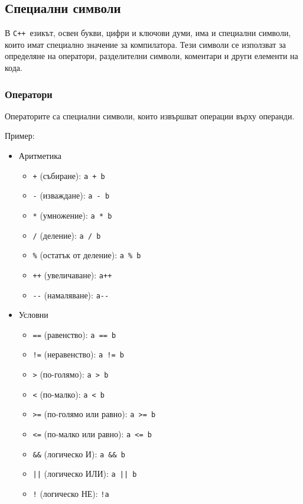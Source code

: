 \documentclass[oneside]{book}
\newcommand*{\code}[1]{\texttt{#1}}
\newcommand*{\cpp}{\texttt{C++}\ }
\begin{document}
\subsection{Специални символи}
В \cpp езикът, освен букви, цифри и ключови думи, има и специални символи, които имат специално значение за компилатора. Тези символи се използват за определяне на оператори, разделителни символи, коментари и други елементи на кода.

\subsubsection{Оператори}
Операторите са специални символи, които извършват операции върху операнди.

Пример:
\begin{itemize}
    \centering
    \item[] Аритметика
    \begin{itemize}
        \item[] \code{+} (събиране): \code{a + b}
        \item[] \code{-} (изваждане): \code{a - b}
        \item[] \code{*} (умножение): \code{a * b}
        \item[] \code{/} (деление): \code{a / b}
        \item[] \code{\%} (остатък от деление): \code{a \% b}
        \item[] \code{++} (увеличаване): \code{a++}
        \item[] \code{-}\code{-} (намаляване): \code{a-}\code{-}
    \end{itemize}
    \item[] Условни
    \begin{itemize}
        \item[] \code{==} (равенство): \code{a == b}
        \item[] \code{!=} (неравенство): \code{a != b}
        \item[] \code{>} (по-голямо): \code{a > b}
        \item[] \code{<} (по-малко): \code{a < b}
        \item[] \code{>=} (по-голямо или равно): \code{a >= b}
        \item[] \code{<=} (по-малко или равно): \code{a <= b}
        \item[] \code{\&\&} (логическо И): \code{a \&\& b}
        \item[] \code{||} (логическо ИЛИ): \code{a || b}
        \item[] \code{!} (логическо НЕ): \code{!a}

\end{itemize}
\end{itemize}
\end{document}
